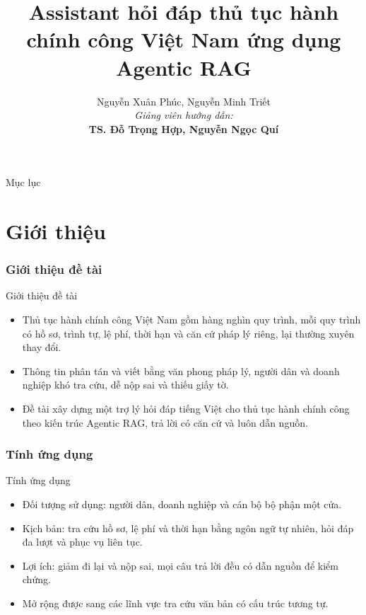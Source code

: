 \documentclass[9pt]{beamer}
\title[Agentic RAG -- TTHC]{\textbf{Assistant hỏi đáp thủ tục hành chính công Việt Nam ứng dụng Agentic RAG}}
\author[Nhóm SE365]{
    Nguyễn Xuân Phúc, Nguyễn Minh Triết \\[0.4cm]
    \small \textit{Giảng viên hướng dẫn:} \\
    \textbf{TS. Đỗ Trọng Hợp, Nguyễn Ngọc Quí}
}
\institute[UIT]{Trường Đại học Công nghệ Thông tin -- Đại học Quốc gia TP.HCM}
\date{}
\begin{document}
\begin{frame}
   \titlepage
\end{frame}

\begin{frame}{Mục lục}
    \tableofcontents[part=1]
    \tableofcontents[part=2]
    \tableofcontents[part=3]
    \tableofcontents[part=4]
    \tableofcontents[part=5]
\end{frame}

\part{Giới thiệu}

\section{Giới thiệu đề tài}
\begin{frame}{Giới thiệu đề tài}
  \begin{itemize}
    \item Thủ tục hành chính công Việt Nam gồm hàng nghìn quy trình, mỗi quy trình có hồ sơ, trình tự, lệ phí, thời hạn và căn cứ pháp lý riêng, lại thường xuyên thay đổi.
    \item Thông tin phân tán và viết bằng văn phong pháp lý, người dân và doanh nghiệp khó tra cứu, dễ nộp sai và thiếu giấy tờ.
    \item Đề tài xây dựng một trợ lý hỏi đáp tiếng Việt cho thủ tục hành chính công theo kiến trúc Agentic RAG, trả lời có căn cứ và luôn dẫn nguồn.
  \end{itemize}
\end{frame}

\section{Tính ứng dụng}
\begin{frame}{Tính ứng dụng}
  \begin{itemize}
    \item Đối tượng sử dụng: người dân, doanh nghiệp và cán bộ bộ phận một cửa.
    \item Kịch bản: tra cứu hồ sơ, lệ phí và thời hạn bằng ngôn ngữ tự nhiên, hỏi đáp đa lượt và phục vụ liên tục.
    \item Lợi ích: giảm đi lại và nộp sai, mọi câu trả lời đều có dẫn nguồn để kiểm chứng.
    \item Mở rộng được sang các lĩnh vực tra cứu văn bản có cấu trúc tương tự.
  \end{itemize}
\end{frame}
\end{document}
